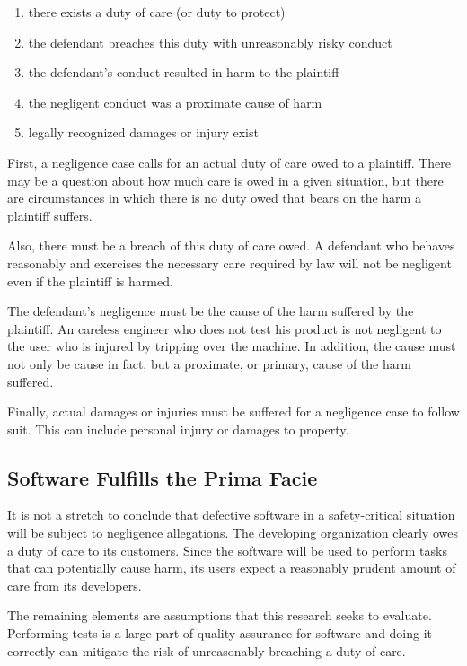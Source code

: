 \singlespace
\begin{enumerate}
 \item there exists a duty of care (or duty to protect)
 \item the defendant breaches this duty with unreasonably risky conduct
 \item the defendant's conduct resulted in harm to the plaintiff
 \item the negligent conduct was a proximate cause of harm
 \item legally recognized damages or injury exist
\end{enumerate}
\doublespace

First, a negligence case calls for an actual duty of care owed to a plaintiff.
There may be a question about how much care is owed in a given situation, but
there are circumstances in which there is no duty owed that bears on the harm a
plaintiff suffers.

Also, there must be a breach of this duty of care owed. A defendant who behaves
reasonably and exercises the necessary care required by law will not be
negligent even if the plaintiff is harmed.

The defendant's negligence must be the cause of the harm suffered by the
plaintiff. An careless engineer who does not test his product is not negligent
to the user who is injured by tripping over the machine. In addition, the cause
must not only be cause in fact, but a proximate, or primary, cause of the harm
suffered.

Finally, actual damages or injuries must be suffered for a negligence case to
follow suit. This can include personal injury or damages to property.

\subsection{Software Fulfills the Prima Facie}

It is not a stretch to conclude that defective software in a safety-critical
situation will be subject to negligence allegations. The developing
organization clearly owes a duty of care to its customers. Since the software
will be used to perform tasks that can potentially cause harm, its users expect
a reasonably prudent amount of care from its developers.

The remaining elements are assumptions that this research seeks to evaluate.
Performing tests is a large part of quality assurance for software and doing it
correctly can mitigate the risk of unreasonably breaching a duty of care.

